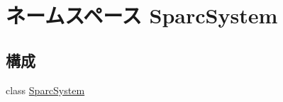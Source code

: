 \hypertarget{namespaceSparcSystem}{
\section{ネームスペース SparcSystem}
\label{namespaceSparcSystem}
}
\subsection*{構成}
\begin{DoxyCompactItemize}
\item 
class \hyperlink{classSparcSystem_1_1SparcSystem}{SparcSystem}
\end{DoxyCompactItemize}
